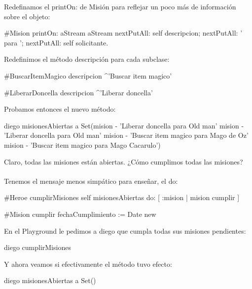 \documentclass[a4paper,12pt]{book}
\begin{document}
\vspace{\baselineskip}
Redefinamos el printOn: de Misión para reflejar un poco más de información sobre el objeto:

\begin{code}
#Mision
printOn: aStream
   aStream nextPutAll: self descripcion;
		nextPutAll: ' para ';
		nextPutAll: self solicitante.
\end{code}

Redefinimos el método descripción para cada subclase:

\begin{code}
#BuscarItemMagico
descripcion
  ^'Buscar item magico'

#LiberarDoncella
descripcion
  ^'Liberar doncella'
\end{code}
  
\vspace{\baselineskip}
Probamos entonces el nuevo método:

\begin{code}
diego misionesAbiertas
   a Set(mision - 'Liberar doncella para Old man' 
         mision - 'Liberar doncella para Old man'
         mision - 'Buscar item magico para Mago de Oz'
         mision - 'Buscar item magico para Mago Cacarulo')
\end{code}

Claro, todas las misiones están abiertas. ¿Cómo cumplimos todas las misiones?
\\
\\
Tenemos el mensaje menos simpático para enseñar, el do:

\begin{code}
#Heroe
cumplirMisiones
  self misionesAbiertas do: [ :mision | mision cumplir ] 
  
#Mision
cumplir
  fechaCumplimiento := Date new
\end{code}

\vspace{\baselineskip}
En el Playground le pedimos a diego que cumpla todas sus misiones pendientes:

\begin{code}
diego cumplirMisiones
\end{code}

\vspace{\baselineskip}
Y ahora veamos si efectivamente el método tuvo efecto:

\begin{code}
diego misionesAbiertas
      a Set()
\end{code}
\end{document}
